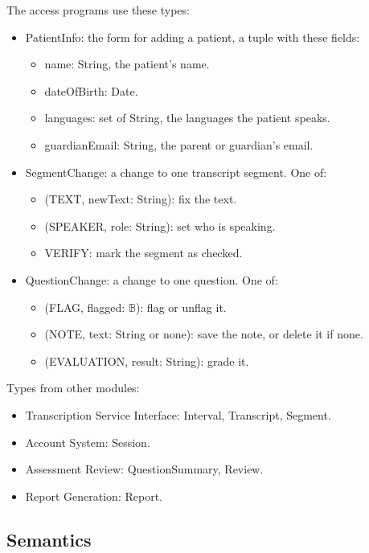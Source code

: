 \documentclass[12pt, titlepage]{article}
\begin{document}
\noindent The access programs use these types:
\begin{itemize}
\item PatientInfo: the form for adding a patient, a tuple with these fields:
  \begin{itemize}
  \item name: String, the patient's name.
  \item dateOfBirth: Date.
  \item languages: set of String, the languages the patient speaks.
  \item guardianEmail: String, the parent or guardian's email.
  \end{itemize}
\item SegmentChange: a change to one transcript segment. One of:
  \begin{itemize}
  \item (TEXT, newText: String): fix the text.
  \item (SPEAKER, role: String): set who is speaking.
  \item VERIFY: mark the segment as checked.
  \end{itemize}
\item QuestionChange: a change to one question. One of:
  \begin{itemize}
  \item (FLAG, flagged: $\mathbb{B}$): flag or unflag it.
  \item (NOTE, text: String or none): save the note, or delete it if none.
  \item (EVALUATION, result: String): grade it.
  \end{itemize}
\end{itemize}
Types from other modules:
\begin{itemize}
\item Transcription Service Interface: Interval, Transcript, Segment.
\item Account System: Session.
\item Assessment Review: QuestionSummary, Review.
\item Report Generation: Report.
\end{itemize}

\subsection{Semantics}
\end{document}
